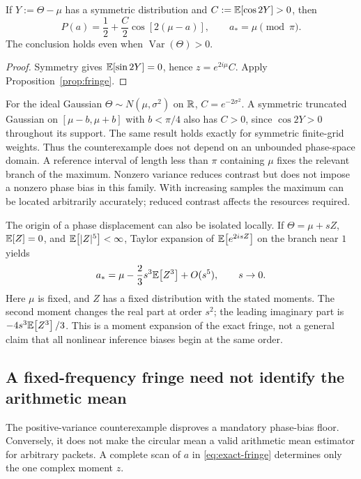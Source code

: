 \begin{corollary}
\label{cor:symmetric-no-bias}
If $Y:=\Theta-\mu$ has a symmetric distribution and
$C:=\mathbb E\!\left[\cos2Y\right]>0$, then
\begin{equation}
 P(a)=\frac12+\frac C2\cos[2(\mu-a)],\qquad a_*=\mu\pmod\pi.
 \label{eq:symmetric-fringe}
\end{equation}
The conclusion holds even when $\operatorname{Var}(\Theta)>0$.
\end{corollary}

\begin{proof}
Symmetry gives $\mathbb E\!\left[\sin2Y\right]=0$, hence $z=e^{2i\mu}C$.
Apply Proposition~\ref{prop:fringe}.
\end{proof}

For the ideal Gaussian $\Theta\sim N(\mu,\sigma^2)$ on $\mathbb R$,
$C=e^{-2\sigma^2}$. A symmetric truncated Gaussian on
$[\mu-b,\mu+b]$ with $b<\pi/4$ also has $C>0$, since $\cos2Y>0$
throughout its support. The same result holds exactly for symmetric
finite-grid weights. Thus the counterexample does not depend on an
unbounded phase-space domain. A reference interval of length less than
$\pi$ containing $\mu$ fixes the relevant branch of the maximum.
Nonzero variance reduces contrast but does not impose a nonzero phase
bias in this family. With increasing samples the maximum can be located
arbitrarily accurately; reduced contrast affects the resources required.

The origin of a phase displacement can also be isolated locally. If
$\Theta=\mu+sZ$, $\mathbb E\!\left[Z\right]=0$, and $\mathbb E\!\left[|Z|^5\right]<\infty$, Taylor expansion of
$\mathbb E\!\left[e^{2isZ}\right]$ on the branch near $1$ yields
\begin{equation}
 a_* =\mu-\frac23s^3\mathbb E\!\left[Z^3\right]+O(s^5),\qquad s\to0.
 \label{eq:phase-asymmetry}
\end{equation}
Here $\mu$ is fixed, and $Z$ has a fixed distribution with the stated
moments. The second moment changes the real part at order $s^2$;
the leading imaginary part is $-4s^3\mathbb E\!\left[Z^3\right]/3$.
This is a moment expansion of the exact fringe, not a general claim that
all nonlinear inference biases begin at the same order.

\subsection{A fixed-frequency fringe need not identify the arithmetic mean}
The positive-variance counterexample disproves a mandatory phase-bias
floor. Conversely, it does not make the circular mean a valid arithmetic
mean estimator for arbitrary packets. A complete scan of $a$ in
\eqref{eq:exact-fringe} determines only the one complex moment $z$.

